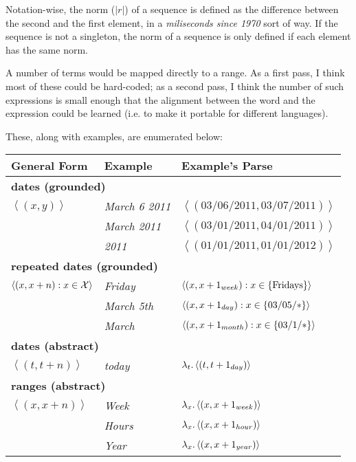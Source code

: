\documentclass{article}
\begin{document}
Notation-wise, the norm ($|r|$) of a sequence is defined as the difference
	between the second and the first element, in a {\em miliseconds since
	1970} sort of way.
If the sequence is not a singleton, the norm of a sequence is only defined
	if each element has the same norm.

A number of terms would be mapped directly to a range.
As a first pass, I think most of these could be hard-coded;
as a second pass, I think the number of such expressions is small enough
	that the alignment between the word and the expression could be learned
	(i.e. to make it portable for different languages).

These, along with examples, are enumerated below:

\begin{center}
\begin{tabular}{l l l}
	{\bf General Form} & {\bf Example} & {\bf Example's Parse} \\
	\hline

	\multicolumn{3}{l}{{\bf dates (grounded)}} \\
		$\left< (x, y) \right>$
		& {\em March 6 2011} & $\left< (03/06/2011, 03/07/2011) \right>$ \\
		& {\em March 2011} & $\left< (03/01/2011, 04/01/2011) \right>$ \\
		& {\em 2011} & $\left< (01/01/2011, 01/01/2012) \right>$ \\
	
	\multicolumn{3}{l}{{\bf repeated dates (grounded)}} \\
		$\left< (x, x+n) : x \in \sX \right>$
		& {\em Friday} & $\left< (x,x+\week{1}) : x \in \{ \T{Fridays} \} \right>$\\
		& {\em March 5th} & $\left< (x,x+\day{1}) : x \in \{ 03/05/* \} \right>$ \\
		& {\em March} & $\left< (x,x+\month{1}) : x \in \{ 03/1/* \} \right>$ \\
	
	\multicolumn{3}{l}{{\bf dates (abstract)}} \\
		$\left< (t, t+n) \right>$
		& {\em today} & $\lambda_t.\left< (t,t+\day{1}) \right>$\\
	
	\multicolumn{3}{l}{{\bf ranges (abstract)}} \\
		$\left< (x, x+n) \right>$
		& {\em Week} & $\lambda_x.\left< (x,x+\week{1}) \right>$\\
		& {\em Hours} & $\lambda_x.\left< (x,x+\hour{1}) \right>$\\
		& {\em Year} & $\lambda_x.\left< (x,x+\year{1}) \right>$\\
\end{tabular}
\end{center}
\end{document}
